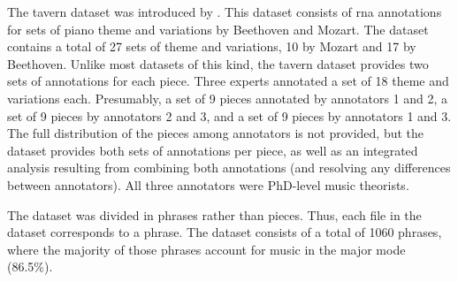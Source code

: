 

The \gls{tavern} dataset was introduced by
\textcite{devaney2015theme}. This dataset consists of
\gls{rna} annotations for sets of piano theme and variations
by Beethoven and Mozart. The dataset contains a total of 27
sets of theme and variations, 10 by Mozart and 17 by
Beethoven. Unlike most datasets of this kind, the
\gls{tavern} dataset provides two sets of annotations for
each piece. Three experts annotated a set of 18 theme and
variations each. Presumably, a set of 9 pieces annotated by
annotators 1 and 2, a set of 9 pieces by annotators 2 and 3,
and a set of 9 pieces by annotators 1 and 3. The full
distribution of the pieces among annotators is not provided,
but the dataset provides both sets of annotations per piece,
as well as an integrated analysis resulting from combining
both annotations (and resolving any differences between
annotators). All three annotators were PhD-level music
theorists.

The dataset was divided in phrases rather than pieces. Thus,
each file in the dataset corresponds to a phrase. The
dataset consists of a total of 1060 phrases, where the
majority of those phrases account for music in the major mode
(86.5\%).